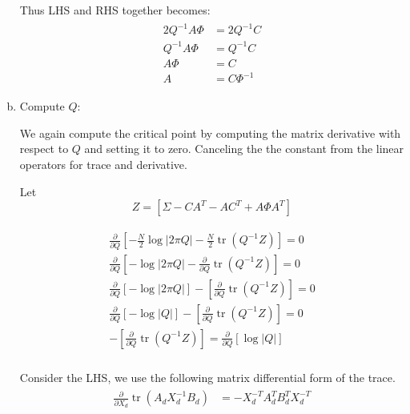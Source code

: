 \documentclass{tufte-handout}
\begin{document}
\begin{enumerate}[(a)]
    Thus LHS and RHS together becomes: 
    \begin{multline}
        \begin{aligned}
            2 Q^{-1} A \Phi &= 2 Q^{-1} C \\
            Q^{-1} A \Phi &=  Q^{-1} C \\
            A \Phi &=  C \\
            A &=  C \Phi^{-1} 
        \end{aligned}
    \end{multline}        

    \item Compute $Q$:

    We again compute the critical point by computing the matrix derivative with respect to $Q$ and setting it to zero. Canceling the the constant
    from the linear operators for trace and derivative.
    
    Let $$Z =  \left[  \Sigma -  CA^{T} - A C^T + A \Phi A^T \right]$$

    \begin{multline}
        \begin{aligned}
           \frac{\partial} {\partial Q} \left[ -\frac{N}{2} \log |2\pi Q|  - \frac{N}{2} \operatorname{tr} \left( Q^{-1} Z \right)\right] = 0 \\
           \frac{\partial} {\partial Q} \left[ -\log |2\pi Q|  - \frac{\partial} {\partial Q} \operatorname{tr} \left( Q^{-1}  Z\right)\right] = 0 \\
           \frac{\partial} {\partial Q} \left[ -\log |2\pi Q| \right]  - \left[ \frac{\partial} {\partial Q} \operatorname{tr} \left( Q^{-1} Z \right) \right] = 0 \\
           \frac{\partial} {\partial Q} \left[ -\log |Q| \right]  - \left[ \frac{\partial} {\partial Q} \operatorname{tr} \left( Q^{-1} Z \right) \right] = 0 \\
           -\left[ \frac{\partial} {\partial Q} \operatorname{tr} \left( Q^{-1} Z \right) \right] = \frac{\partial} {\partial Q} \left[ \log |Q| \right]   \\ 
        \end{aligned}
    \end{multline}
   
    Consider the LHS, we use the following matrix differential form of the trace.
    \begin{multline}
        \begin{aligned}
            \frac{\partial}{\partial X_d} \operatorname{tr}(A_{d}X_{d}^{-1}B_{d}) &= -X_d^{-T}A_d^{T} B_d^T X_d^{-T}
        \end{aligned}
    \end{multline} 


\end{enumerate}
\end{document}
